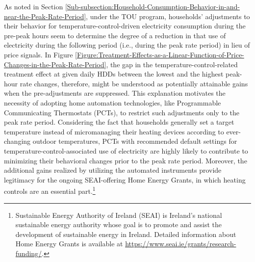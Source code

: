 As noted in Section \ref{Sub-subsection:Household-Consumption-Behavior-in-and-near-the-Peak-Rate-Period}, under the TOU program, households' adjustments to their behavior for temperature-control-driven electricity consumption during the pre-peak hours seem to determine the degree of a reduction in that use of electricity during the following period (i.e., during the peak rate period) in lieu of price signals. In Figure \ref{Figure:Treatment-Effects-as-a-Linear-Function-of-Price-Changes-in-the-Peak-Rate-Period}, the gap in the temperature-control-related treatment effect at given daily HDDs between the lowest and the highest peak-hour rate changes, therefore, might be understood as potentially attainable gains when the pre-adjustments are suppressed. This explanation motivates the necessity of adopting home automation technologies, like Programmable Communicating Thermostats (PCTs), to restrict such adjustments only to the peak rate period. Considering the fact that households generally set a target temperature instead of micromanaging their heating devices according to ever-changing outdoor temperatures, PCTs with recommended default settings for temperature-control-associated use of electricity are highly likely to contribute to minimizing their behavioral changes prior to the peak rate period.
Moreover, the additional gains realized by utilizing the automated instruments provide legitimacy for the ongoing SEAI-offering Home Energy Grants, in which heating controls are an essential part.\footnote{Sustainable Energy Authority of Ireland (SEAI) is Ireland's national sustainable energy authority whose goal is to promote and assist the development of sustainable energy in Ireland. Detailed information about Home Energy Grants is available at \url{https://www.seai.ie/grants/research-funding/}.} 
